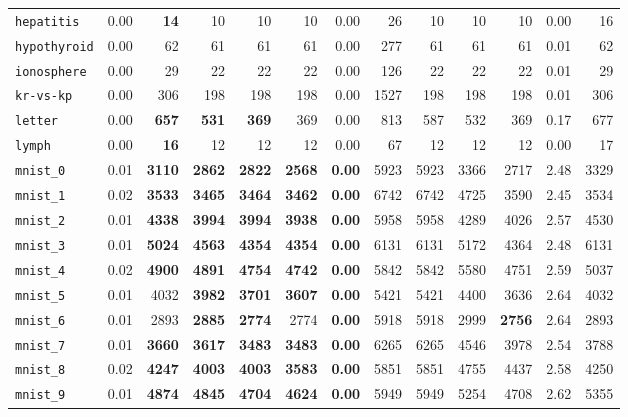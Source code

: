 \begin{tabular}{lrrrrrrrrrrrr}
\texttt{hepatitis} & 0.00 & \textbf{14} & 10 & 10 & 10 & 0.00 & 26 & 10 & 10 & 10 & 0.00 & 16\\
\texttt{hypothyroid} & 0.00 & 62 & 61 & 61 & 61 & 0.00 & 277 & 61 & 61 & 61 & 0.01 & 62\\
\texttt{ionosphere} & 0.00 & 29 & 22 & 22 & 22 & 0.00 & 126 & 22 & 22 & 22 & 0.01 & 29\\
\texttt{kr-vs-kp} & 0.00 & 306 & 198 & 198 & 198 & 0.00 & 1527 & 198 & 198 & 198 & 0.01 & 306\\
\texttt{letter} & 0.00 & \textbf{657} & \textbf{531} & \textbf{369} & 369 & 0.00 & 813 & 587 & 532 & 369 & 0.17 & 677\\
\texttt{lymph} & 0.00 & \textbf{16} & 12 & 12 & 12 & 0.00 & 67 & 12 & 12 & 12 & 0.00 & 17\\
\texttt{mnist\_0} & 0.01 & \textbf{3110} & \textbf{2862} & \textbf{2822} & \textbf{2568} & \textbf{0.00} & 5923 & 5923 & 3366 & 2717 & 2.48 & 3329\\
\texttt{mnist\_1} & 0.02 & \textbf{3533} & \textbf{3465} & \textbf{3464} & \textbf{3462} & \textbf{0.00} & 6742 & 6742 & 4725 & 3590 & 2.45 & 3534\\
\texttt{mnist\_2} & 0.01 & \textbf{4338} & \textbf{3994} & \textbf{3994} & \textbf{3938} & \textbf{0.00} & 5958 & 5958 & 4289 & 4026 & 2.57 & 4530\\
\texttt{mnist\_3} & 0.01 & \textbf{5024} & \textbf{4563} & \textbf{4354} & \textbf{4354} & \textbf{0.00} & 6131 & 6131 & 5172 & 4364 & 2.48 & 6131\\
\texttt{mnist\_4} & 0.02 & \textbf{4900} & \textbf{4891} & \textbf{4754} & \textbf{4742} & \textbf{0.00} & 5842 & 5842 & 5580 & 4751 & 2.59 & 5037\\
\texttt{mnist\_5} & 0.01 & 4032 & \textbf{3982} & \textbf{3701} & \textbf{3607} & \textbf{0.00} & 5421 & 5421 & 4400 & 3636 & 2.64 & 4032\\
\texttt{mnist\_6} & 0.01 & 2893 & \textbf{2885} & \textbf{2774} & 2774 & \textbf{0.00} & 5918 & 5918 & 2999 & \textbf{2756} & 2.64 & 2893\\
\texttt{mnist\_7} & 0.01 & \textbf{3660} & \textbf{3617} & \textbf{3483} & \textbf{3483} & \textbf{0.00} & 6265 & 6265 & 4546 & 3978 & 2.54 & 3788\\
\texttt{mnist\_8} & 0.02 & \textbf{4247} & \textbf{4003} & \textbf{4003} & \textbf{3583} & \textbf{0.00} & 5851 & 5851 & 4755 & 4437 & 2.58 & 4250\\
\texttt{mnist\_9} & 0.01 & \textbf{4874} & \textbf{4845} & \textbf{4704} & \textbf{4624} & \textbf{0.00} & 5949 & 5949 & 5254 & 4708 & 2.62 & 5355\\

\end{tabular}
